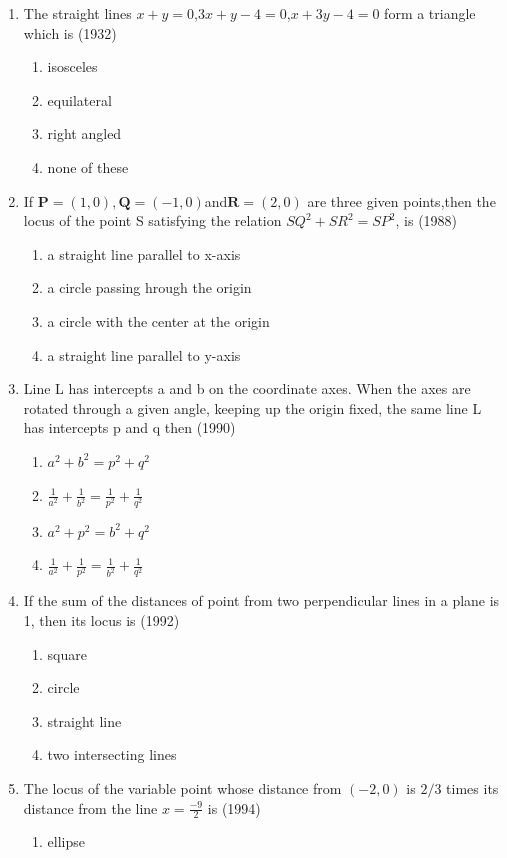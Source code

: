 \documentclass[12pt]{article}
\let\vec\mathbf
\begin{document}
\begin{enumerate}
\begin{enumerate}
\item The straight lines $x+y=0$,$3x+y-4=0$,$x+3y-4=0$ form a triangle which is (1932)
\begin{enumerate}
\item isosceles
\item equilateral
\item right angled
\item none of these
\end{enumerate}
\item If $\vec{P}=(1,0),\vec{Q}=(-1,0) $and$ \vec{R}=(2,0)$ are three given points,then the locus of the point S satisfying the relation $SQ^2+SR^2=SP^2$, is (1988)
\begin{enumerate}
\item a straight line parallel to x-axis  
\item a circle passing hrough the origin 
\item a circle with the center at the origin 
\item a straight line parallel to y-axis
\end{enumerate}
\item Line L has intercepts a and b on the coordinate axes. When the axes are rotated through a given angle, keeping up the origin fixed, the same line L has intercepts  p and q then (1990)
\begin{enumerate}
\item $a^2+b^2=p^2+q^2$ 
\item $\frac{1}{a^2} +\frac{1}{b^2}=\frac{1}{p^2}+\frac{1}{q^2}$ 
\item $a^2+p^2=b^2+q^2$ 
\item $\frac{1}{a^2}+\frac{1}{p^2}=\frac{1}{b^2}+\frac{1}{q^2}$
\end{enumerate}
\item If the sum of the distances of point from two perpendicular lines in a plane is 1, then its locus is (1992)
\begin{enumerate}
\item square 
\item circle 
\item straight line  
\item two intersecting lines
\end{enumerate}
\item The locus of the variable point whose distance from $(-2,0)$ is $2/3$ times its distance from the line $x= \frac{-9}{2}$ is (1994)
\begin{enumerate}
\item ellipse 

\end{enumerate}
\end{enumerate}
\end{enumerate}
\end{document}
